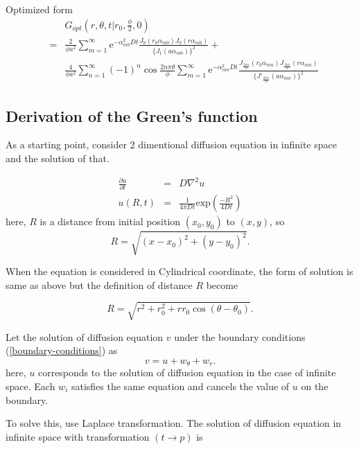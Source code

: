 \documentclass{article}
\begin{document}
Optimized form
\begin{eqnarray}
    & & G_{opt}(r, \theta, t | r_0, \frac{\phi}{2}, 0) \nonumber \\
    &=& \frac{2}{\phi a^2} \sum^{\infty}_{m=1}
        \mathrm{e}^{-\alpha_{m0}^2Dt}
        \frac{J_0(r_0\alpha_{m0})
              J_0(r\alpha_{m0})}
             {\{J_1(a\alpha_{m0})\}^2}+\nonumber\\
    & & \frac{4}{\phi a^2}\sum^{\infty}_{n=1}
        (-1)^n\cos\frac{2n\pi\theta}{\phi}
        \sum^{\infty}_{m=1}
        \mathrm{e}^{-\alpha_{mn}^2Dt}
        \frac{J_{\frac{2n\pi}{\phi}}(r_0\alpha_{mn})
              J_{\frac{2n\pi}{\phi}}(r\alpha_{mn})}
             {\{J'_{\frac{2n\pi}{\phi}}(a\alpha_{mn})\}^2}
\end{eqnarray}

\subsection{Derivation of the Green's function}
As a starting point, consider 2 dimentional diffusion equation in infinite space
and the solution of that.

\begin{eqnarray}
    \frac{\partial u}{\partial t} &=& D\nabla^2 u \\
    u(R, t) &=& \frac{1}{4\pi Dt}\mathrm{exp}\left(\frac{-R^2}{4Dt}\right)
\end{eqnarray}
here, $R$ is a distance from initial position $(x_0, y_0)$ to $(x, y)$, so
\begin{equation}
 R = \sqrt{(x-x_0)^2+(y-y_0)^2}.
\end{equation}

When the equation is considered in Cylindrical coordinate, the form of solution
 is same as above but the definition of distance $R$ become

\begin{equation}
    R = \sqrt{r^2+r_0^2+rr_0\cos(\theta - \theta_0)}.
\end{equation}

Let the solution of diffusion equation $v$ under the boundary conditions
 (\ref{boundary-conditions}) as
\begin{equation}
    v = u + w_\theta + w_r.
\end{equation}
here, $u$ corresponds to the solution of diffusion equation in the case of
 infinite space. Each $w_i$ satisfies the same equation and cancels the value
 of $u$ on the boundary.

To solve this, use Laplace transformation.
 The solution of diffusion equation in infinite space with transformation
 $(t\rightarrow p)$ is
\end{document}
